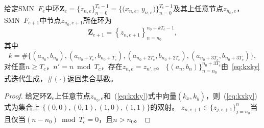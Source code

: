 \begin{Property}
给定SMN\ $F_e$中环$\textbf{Z}_e=\{z_{n, e}\}_{n=0}^{T_c-1}=\{(x_{n, e}$, $y_{n, e})\}_{n=0}^{T_c-1}$及其上任意节点$z_{n_0, e}$，
SMN\ $F_{e+1}$中节点$z_{n_0, e+1}$所在环为
	\begin{equation*}
	\textbf{Z}_{e+1}=\left\{ z_{n, e+1} \right\}_{n=n_0}^{n_0+kT_c-1},
	\end{equation*}
	其中
	\begin{equation}
	k = \#\{(a_{n_0}, b_{n_0}), (a_{n_0+T_c}, b_{n_0+T_c}), (a_{n_0+2T_c}, b_{n_0+2T_c}), (a_{n_0+3T_c}, b_{n_0+3T_c})\},
	\label{numberElements}	
	\end{equation}
对任意$n\ge T_c$，$n'=n\bmod T_c$，存在$z_{n, e}=z_{n', e}$。
$\{(a_{n}, b_{n})\}_{n=n_0}^{n_0+3T_c}$由~\eqref{eq:kxky}式迭代生成，$\#(\cdot)$返回集合基数。
\label{Prop:cycleExpan}
\end{Property}

\begin{proof}
给定环$\textbf{Z}_e$上任意节点$z_{n_0, e}$和~(\ref{eq:kxky})式中向量$(k_x, k_y)$，则~(\ref{eq:kxky})式为集合上
$\{(0, 0), (0, 1), (1, 0), (1, 1) \}$的双射。
$z_{n, e+1}\in \{z_{j, e+1}\}_{j=n_0}^n$当且仅当$(n-n_0)\bmod T_c=0$，且$n>n_0$。\qedsymbol
\end{proof}

